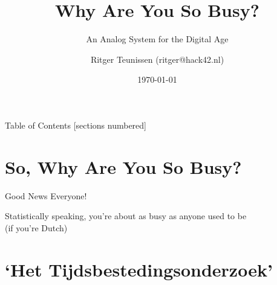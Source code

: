 \documentclass[aspectratio=169]{beamer}
\title{Why Are You So Busy?}
\subtitle{An Analog System for the Digital Age}
\author{Ritger Teunissen (ritger@hack42.nl)}
\institute{Hack42, Arnhem}
\date{\today}
\begin{document}
    \maketitle

    \begin{frame}{Table of Contents}
        [sections numbered]
        \tableofcontents[hideallsubsections]
    \end{frame}

    \section{So, Why Are You So Busy?}

    {
    \begin{frame}{Good News Everyone!}
        \begin{titlebox}
            \centering
            {\alert{Statistically} speaking, you're about as busy as anyone used
            to be \\ (if you're Dutch)}
        \end{titlebox}
    \end{frame}
    }

    \section{`Het Tijdsbestedingsonderzoek'}
\end{document}
